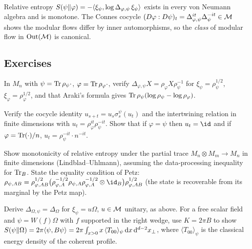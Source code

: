 \begin{keyidea}
Relative entropy $S(\psi\|\varphi)=-\langle \xi_\psi,\log\Delta_{\varphi,\psi}\,\xi_\psi\rangle$ exists in every von Neumann algebra and is monotone. The Connes cocycle $(D\varphi:D\psi)_t=\Delta_{\varphi,\psi}^{it}\Delta_\psi^{-it}\in\mathcal{M}$ shows the modular flows differ by inner automorphisms, so the \emph{class} of modular flow in $\mathrm{Out}(\mathcal{M})$ is canonical.
\end{keyidea}

\subsection*{Exercises}
\begin{exercise}\label{ex:modham:1}
In $M_n$ with $\psi=\operatorname{Tr}\rho_\psi\cdot$, $\varphi=\operatorname{Tr}\rho_\varphi\cdot$, verify $\Delta_{\varphi,\psi}X=\rho_\varphi X\rho_\psi^{-1}$ for $\xi_\psi=\rho_\psi^{1/2}$, $\xi_\varphi=\rho_\varphi^{1/2}$, and that Araki's formula gives $\operatorname{Tr}\rho_\psi(\log\rho_\psi-\log\rho_\varphi)$.
\end{exercise}
\begin{exercise}\label{ex:modham:2}
Verify the cocycle identity $u_{s+t}=u_s\sigma^\psi_s(u_t)$ and the intertwining relation in finite dimensions with $u_t=\rho_\varphi^{it}\rho_\psi^{-it}$. Show that if $\varphi=\psi$ then $u_t=\id$ and if $\varphi=\operatorname{Tr}(\cdot)/n$, $u_t=\rho_\psi^{-it}\cdot n^{-it}$.
\end{exercise}
\begin{exercise}\label{ex:modham:3}
Show monotonicity of relative entropy under the partial trace $M_n\otimes M_m\to M_n$ in finite dimensions (Lindblad--Uhlmann), assuming the data-processing inequality for $\operatorname{Tr}_B$. State the equality condition of Petz: $\rho_{\psi,AB}=\rho_{\varphi,AB}^{1/2}\big(\rho_{\varphi,A}^{-1/2}\rho_{\psi,A}\rho_{\varphi,A}^{-1/2}\otimes\id_B\big)\rho_{\varphi,AB}^{1/2}$ (the state is recoverable from its marginal by the Petz map).
\end{exercise}
\begin{exercise}\label{ex:modham:4}
Derive $\Delta_{\Omega,\psi}=\Delta_\Omega$ for $\xi_\psi=u\Omega$, $u\in\mathcal{M}$ unitary, as above. For a free scalar field and $\psi=W(f)\Omega$ with $f$ supported in the right wedge, use $K=2\pi B$ to show $S(\psi\|\Omega)=2\pi\langle \psi,B\psi\rangle=2\pi\int_{x>0}x\,\langle T_{00}\rangle_\psi\,\mathrm{d} x\,\mathrm{d}^{d-2}x_\perp$, where $\langle T_{00}\rangle_\psi$ is the classical energy density of the coherent profile.
\end{exercise}

